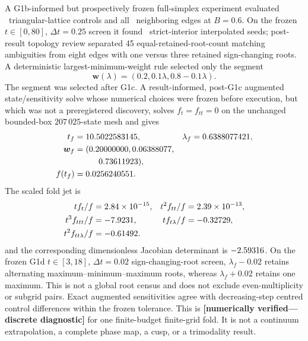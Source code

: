\documentclass[aps,physrev,reprint,amsmath,amssymb,longbibliography,floatfix]{revtex4-2}
\newcommand{\status}[1]{\textbf{[#1]}}
\begin{document}
A G1b-informed but prospectively frozen full-simplex experiment evaluated
\GOneCControlCount\ triangular-lattice controls and all \GOneCEdgeCount\
neighboring edges at $B=0.6$.  On the frozen $t\in[0,80]$, $\Delta t=0.25$
screen it found \GOneCSeedCount\ strict-interior interpolated seeds;
post-result topology review separated 45 equal-retained-root-count matching
ambiguities from eight edges with one versus three retained sign-changing
roots.
A deterministic largest-minimum-weight rule selected only the segment
\begin{equation}
 \bm w(\lambda)=(0.2,0.1\lambda,0.8-0.1\lambda).
\label{eq:g1dsegment}
\end{equation}
The segment was selected after G1c.  A result-informed, post-G1c augmented
state/sensitivity solve whose numerical choices were frozen before execution,
but which was not a preregistered discovery, solves $f_t=f_{tt}=0$ on the
unchanged bounded-box $207\,025$-state mesh and gives
\begin{align}
 t_f&=10.5022583145, &
 \lambda_f&=0.6388077421,\nonumber\\
 \bm w_f&=(0.20000000,0.06388077,\nonumber\\
 &\hspace{2.9em}0.73611923),\nonumber\\
 f(t_f)&=0.0256240551.
\label{eq:g1dfold}
\end{align}
The scaled fold jet is
\begin{align}
 tf_t/f&=2.84\times10^{-15},
 &t^2f_{tt}/f&=2.39\times10^{-13},\nonumber\\
 t^3f_{ttt}/f&=-7.9231,
 &tf_{t\lambda}/f&=-0.32729,\nonumber\\
 t^2f_{tt\lambda}/f&=-0.61492.
\label{eq:g1dfoldjet}
\end{align}
and the corresponding dimensionless Jacobian determinant is
$-2.59316$.
On the frozen G1d $t\in[3,18]$, $\Delta t=0.02$ sign-changing-root screen,
$\lambda_f-0.02$ retains alternating maximum--minimum--maximum roots, whereas
$\lambda_f+0.02$ retains one maximum.  This is not a global root census and
does not exclude even-multiplicity or subgrid pairs.  Exact augmented
sensitivities agree with decreasing-step centred control differences within
the frozen tolerance.  This is
\status{numerically verified---discrete diagnostic} for one finite-budget
finite-grid fold.  It is not a continuum extrapolation, a complete phase
map, a cusp, or a trimodality result.
\end{document}
